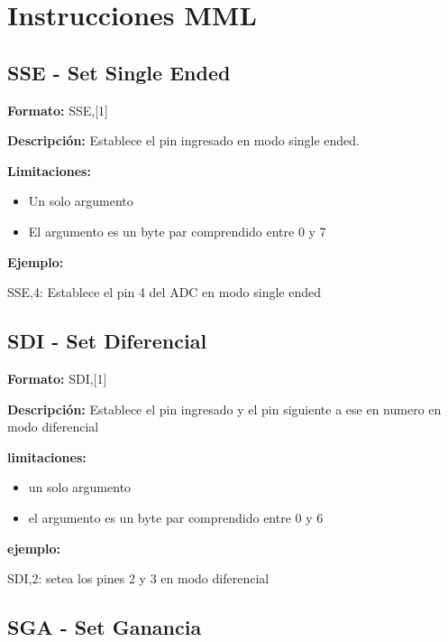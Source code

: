 \section{Instrucciones MML}\label{ap:instrucciones}

\subsection{SSE - Set Single Ended} %
\label{sub:sse_set_single_ended}


\textbf{Formato:} SSE,[1]

\textbf{Descripción:}
Establece el pin ingresado en modo single ended.

\textbf{Limitaciones:}
\begin{itemize}
  \item Un solo argumento
  \item El argumento es un byte par comprendido entre 0 y 7
\end{itemize}

\textbf{Ejemplo:}

SSE,4: Establece el pin 4 del ADC en modo single ended


\subsection{SDI - Set Diferencial} %
\label{sub:sdi_set_diferencial}


\textbf{Formato:} SDI,[1]

\textbf{Descripción:}
Establece el pin ingresado y el pin siguiente a ese en numero en modo diferencial

\textbf{limitaciones:}
\begin{itemize}
  \item un solo argumento
  \item el argumento es un byte par comprendido entre 0 y 6
\end{itemize}

\textbf{ejemplo:}

SDI,2: setea los pines 2 y 3 en modo diferencial


\subsection{SGA - Set Ganancia} %
\label{sub:sga_set_ganancia}



